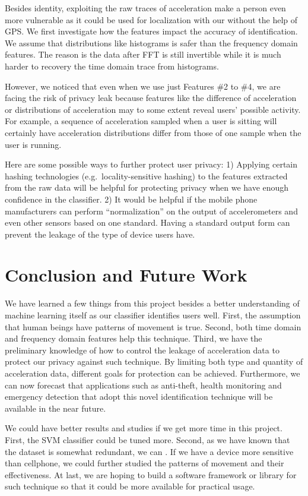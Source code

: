 \documentclass{article} %
\begin{document}
Besides identity, exploiting the raw traces of acceleration make a person even more vulnerable as it could be used for localization with our without the help of GPS. We first investigate how the features impact the accuracy of identification. We assume that distributions like histograms is safer than the frequency domain features. The reason is the data after FFT is still invertible while it is much harder to recovery the time domain trace from histograms. 

However, we noticed that even when we use just Features \#2 to \#4, we are facing the risk of privacy leak because features like the difference of acceleration or distributions of acceleration may to some extent reveal users' possible activity. For example, a sequence of acceleration sampled when a user is sitting will certainly have acceleration distributions differ from those of one sample when the user is running.

Here are some possible ways to further protect user privacy: 1) Applying certain hashing technologies (e.g.\ locality-sensitive hashing) to the features extracted from the raw data will be helpful for protecting privacy when we have enough confidence in the classifier. 2) It would be helpful if the mobile phone manufacturers can perform ``normalization'' on the output of accelerometers and even other sensors based on one standard. Having a standard output form can prevent the leakage of the type of device users have.

\section{Conclusion and Future Work}


We have learned a few things from this project besides a better understanding of machine learning itself as our classifier identifies users well. First, the assumption that human beings have patterns of movement is true. Second, both time domain and frequency domain features help this technique. Third, we have the preliminary knowledge of how to control the leakage of acceleration data to protect our privacy against such technique. By limiting both type and quantity of acceleration data, different goals for protection can be achieved. Furthermore, we can now forecast that applications such as anti-theft, health monitoring and emergency detection that adopt this novel identification technique will be available in the near future.

We could have better results and studies if we get more time in this project. First, the SVM classifier could be tuned more. Second, as we have known that the dataset is somewhat redundant, we can . If we have a device more sensitive than cellphone, we could further studied the patterns of movement and their effectiveness. At last, we are hoping to build a software framework or library for such technique so that it could be more available for practical usage.




\end{document}
